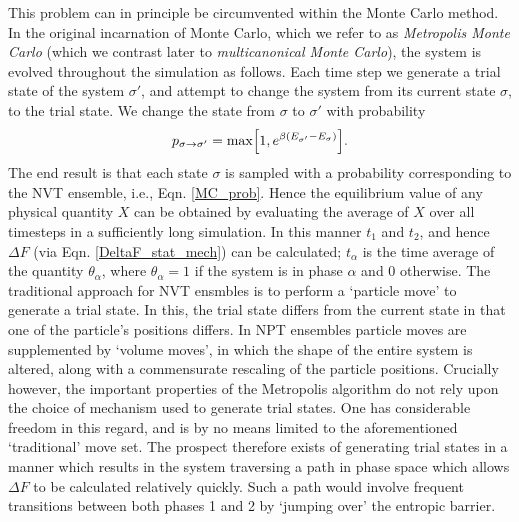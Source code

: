 \documentclass{report}
\begin{document}
This problem can in principle be circumvented within the Monte Carlo method.
In the original incarnation of Monte Carlo, which we refer to as \emph{Metropolis Monte Carlo}\cite{Metropolis_1953} (which we contrast later to 
\emph{multicanonical Monte Carlo}), the system is evolved throughout the simulation as follows. Each time step we generate a trial state of the system 
$\sigma'$, and attempt to change the system from its current state $\sigma$, to the trial state. We change the state from $\sigma$ to $\sigma'$ with 
probability
\begin{equation}\label{p_Metropolis}
p_{\sigma\to\sigma'}=\text{max}\Bigl[1,e^{\beta(E_{\sigma'}-E_{\sigma})}\Bigr].
\end{equation}
The end result is that each state $\sigma$ is sampled with a probability corresponding to the NVT ensemble, i.e., Eqn. \eqref{MC_prob}.
Hence the equilibrium value of any physical quantity $X$ can be obtained by evaluating the average of $X$ over all timesteps in a sufficiently long 
simulation. In this manner $t_1$ and $t_2$, and hence $\Delta F$ (via Eqn. \eqref{DeltaF_stat_mech}) can be calculated; 
$t_{\alpha}$ is the time average of the quantity $\theta_{\alpha}$, where $\theta_{\alpha}=1$ if the system is in phase $\alpha$ and 0 otherwise.
The traditional approach for NVT ensmbles is to perform a `particle move' to generate a trial state. In this, the trial state differs from the
current state in that one of the particle's positions differs. In NPT ensembles particle moves are supplemented by `volume moves', in which the 
shape of the entire system is altered, along with a commensurate rescaling of the particle positions.
Crucially however, the important properties of the Metropolis algorithm do not rely upon the choice of mechanism used to generate trial states. 
One has considerable freedom in this regard, and is by no means limited to the aforementioned `traditional' move set. The prospect therefore exists 
of generating trial states in a manner which results in the system traversing a path in phase space which allows $\Delta F$ to be calculated 
relatively quickly. Such a path would involve frequent transitions between both phases 1 and 2 by `jumping over' the entropic barrier. 
\end{document}
